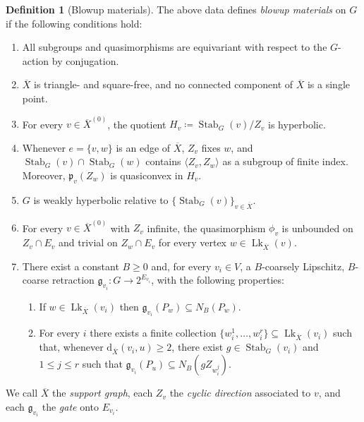 \documentclass[svgnames]{amsart}
\theoremstyle{plain}
\theoremstyle{definition}
\newtheorem{defn}[thm]{Definition}
\newcommand{\ov}[1]{\overline{#1}}
\newcommand{\dist}{\mathrm{d}}
\newcommand{\link}{\operatorname{Lk}}
\newcommand{\Stab}[2]{\operatorname{Stab}_{#1}(#2)}
\newcommand{\gate}{\mathfrak{g}}
\newcommand{\p}{\mathfrak{p}}
\begin{document}
\begin{defn}[Blowup materials]
The above data defines \emph{blowup materials} on $G$ if the following conditions hold:
    \begin{enumerate}[start=0]
        \item\label{squid_material:equivariance} All subgroups and quasimorphisms are equivariant with respect to the $G$-action by conjugation.
        \item\label{squid_material:graph} $\ov{X}$ is triangle- and square-free, and no connected component of $\ov{X}$ is a single point.
        \item\label{squid_material:extensions}
        For every $v\in \ov X^{(0)}$, the quotient $H_v\coloneq \Stab{G}{v}/Z_v$ is hyperbolic.
        \item\label{squid_material:edge_stab} Whenever $e=\{v,w\}$ is an edge of $\ov{X}$, $Z_v$ fixes $w$, and $\Stab{G}{v}\cap\Stab{G}{w}$ contains $\langle Z_v, Z_w\rangle $ as a subgroup of finite index. Moreover, $\p_v(Z_w)$ is quasiconvex in $H_v$.
        \item\label{squid_material:big_papa} $G$ is weakly hyperbolic relative to $\{\Stab{G}{v}\}_{v\in \ov X}$.
        \item\label{squid_material:quasimorphisms} For every $v\in \ov X^{(0)}$ with $Z_v$ infinite, the quasimorphism $\phi_v$ is unbounded on $Z_{v}\cap E_{v}$ and trivial on $Z_w\cap E_{v}$ for every vertex $w\in\link_{\ov X}(v)$. 
        \item\label{squid_material:gates}
        There exist a constant $B\ge 0$ and, for every $v_i\in V$, a $B$-coarsely Lipschitz, $B$-coarse retraction $\gate_{v_i}\colon G\to 2^{E_{v_i}}$,
        with the following properties:
        \begin{enumerate}[label=(\roman*)]
            \item If $w\in\link_{\ov X}(v_i)$ then $\gate_{v_i}(P_w)\subseteq N_B(P_w)$.
            \item For every $i$ there exists a finite collection $\{w_i^1,\ldots, w_i^r\}\subseteq\link_{\ov X}(v_i)$ such that, whenever $\dist_{\ov X}(v_i, u)\ge 2$,  there exist $g\in\Stab{G}{v_i}$ and $1\le j\le r$ such that $\gate_{v_i}(P_u)\subseteq N_B\left(gZ_{w_i^j}\right)$.
        \end{enumerate} 
    \end{enumerate}
    We call $\ov X$ the \emph{support graph}, each $Z_v$ the \emph{cyclic direction} associated to $v$, and each $\gate_{v_i}$ the \emph{gate} onto $E_{v_i}$.
\end{defn}
\end{document}

